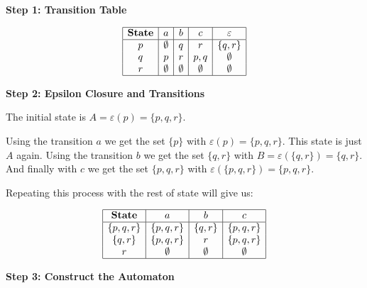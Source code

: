 \textbf{Step 1: Transition Table}

\[
    \begin{array}{|c|c|c|c|c|}
    \hline
    \textbf{State} & a & b & c & \varepsilon \\
    \hline
    p & \emptyset & q & r & \{q, r\} \\
    q & p & r & p,q & \emptyset \\
    r & \emptyset & \emptyset & \emptyset & \emptyset \\
    \hline
    \end{array}
\]

\textbf{Step 2: Epsilon Closure and Transitions}

The initial state is \(A = \varepsilon(p) = \{p,q,r\}\).

Using the transition \(a\) we get the set \(\{p\}\) with \(\varepsilon(p) = \{p,q,r\}\). This state 
is just \(A\) again. Using the transition \(b\) we get the set \(\{q,r\}\) with \(B = \varepsilon(\{q,r\}) = \{q,r\}\).
And finally with \(c\) we get the set \(\{p, q, r\}\) with \(\varepsilon(\{p, q, r\}) = \{p,q, r\}\).
 
Repeating this process with the rest of state will give us: 

\[
    \begin{array}{|c|c|c|c|c|}
    \hline
    \textbf{State} & a & b & c \\
    \hline
    \{p,q,r\} & \{p,q,r\} & \{q,r\} & \{p,q,r\} \\
    \{q,r\}& \{p,q,r\} & r & \{p,q,r\} \\
     r       &  \emptyset  & \emptyset & \emptyset \\
    \hline
    \end{array}
\]


\textbf{Step 3: Construct the Automaton}

\begin{center}
\end{center}

